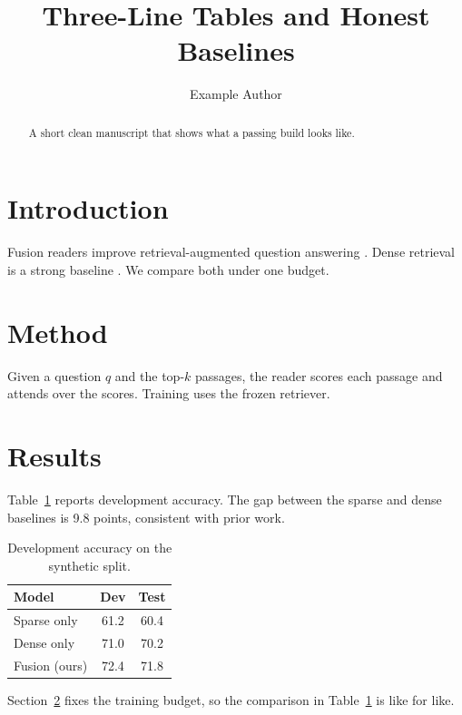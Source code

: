 \documentclass[11pt]{article}
\title{Three-Line Tables and Honest Baselines}
\author{Example Author}
\date{}
\begin{document}
\maketitle

\begin{abstract}
A short clean manuscript that shows what a passing build looks like.
\end{abstract}

\section{Introduction}
\label{sec:intro}
Fusion readers improve retrieval-augmented question answering
\citep{lewis2020rag}. Dense retrieval is a strong baseline
\citep{karpukhin2020dpr}. We compare both under one budget.

\section{Method}
\label{sec:method}
Given a question $q$ and the top-$k$ passages, the reader scores each passage
and attends over the scores. Training uses the frozen retriever.

\section{Results}
\label{sec:results}
Table~\ref{tab:dev} reports development accuracy. The gap between the sparse
and dense baselines is 9.8 points, consistent with prior work.

\begin{table}[t]
\centering
\caption{Development accuracy on the synthetic split.}
\label{tab:dev}
\begin{tabular}{lcc}
\toprule
Model & Dev & Test \\
\midrule
Sparse only & 61.2 & 60.4 \\
Dense only & 71.0 & 70.2 \\
Fusion (ours) & 72.4 & 71.8 \\
\bottomrule
\end{tabular}
\end{table}

Section~\ref{sec:method} fixes the training budget, so the comparison in
Table~\ref{tab:dev} is like for like.



\end{document}
